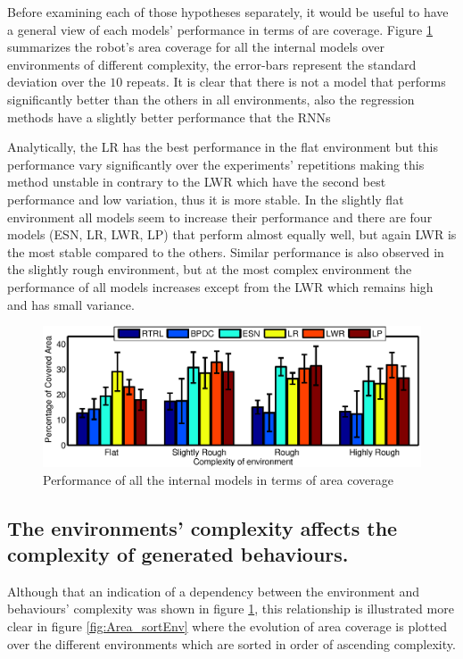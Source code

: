 \documentclass[msc,ai,logo]{infthesis}
\begin{document}
Before examining each of those hypotheses separately, it would be useful to have a general view of each models' performance in terms of are coverage. Figure \ref{fig:Area_Env} summarizes the robot's area coverage for all the internal models over environments of different complexity, the error-bars represent the standard deviation over the $10$ repeats. It is clear that there is not a model that performs significantly better than the others in all environments, also the regression methods have a slightly better performance that the RNNs 

Analytically, the LR has the best performance in the flat environment but this performance vary significantly over the experiments' repetitions making this method unstable in contrary to the LWR which have the second best performance and low variation, thus it is more stable.
In the slightly flat environment all models seem to increase their performance and there are four models (ESN, LR, LWR, LP) that perform almost equally well, but again LWR is the most stable compared to the others. Similar performance is also observed in the slightly rough environment, but at the most complex environment the performance of all models increases except from the LWR which remains high and has small variance.         


\begin{figure}[H]
\includegraphics[scale=0.65]{Area_Env.eps}
\centering
\caption{Performance of all the internal models in terms of area coverage }
\label{fig:Area_Env}
\end{figure}


\subsection*{The environments' complexity affects the complexity of generated behaviours.}

Although that an indication of a dependency between the environment and behaviours' complexity was shown in figure \ref{fig:Area_Env}, this relationship is illustrated more clear in figure \ref{fig:Area_sortEnv} where the evolution of area coverage is plotted over the different environments which are sorted in order of ascending complexity.     
\end{document}
